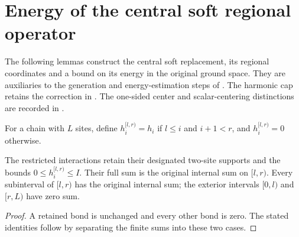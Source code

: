 \section{Energy of the central soft regional operator}

The following lemmas construct the central soft replacement, its regional
coordinates and a bound on its energy in the original ground space.
They are auxiliaries to the generation and energy-estimation steps of
\cite[Figures \texttt{fig:generate} and \texttt{fig:algo1}]{Arad2016RigorousRG}.
The harmonic cap retains the correction in
\cite{gap:alvv16_soft_truncation_log_bound}. The one-sided center and
scalar-centering distinctions are recorded in
\cite{gap:alvv16_soft_regional_energy_centering}.

\begin{definition}
    \label{def:interval_bond_restriction}
    \leanok
    For a chain with $L$ sites, define $h_i^{[l,r)}=h_i$ if
    $l\le i$ and $i+1<r$, and $h_i^{[l,r)}=0$ otherwise.
\end{definition}
\begin{lemma}
    \label{lem:interval_bond_restriction}
    \leanok
    The restricted interactions retain their designated two-site supports
    and the bounds $0\le h_i^{[l,r)}\le I$. Their full sum is the original
    internal sum on $[l,r)$. Every subinterval of $[l,r)$ has the original
    internal sum; the exterior intervals $[0,l)$ and $[r,L)$ have zero sum.
\end{lemma}
\begin{proof}\leanok
    A retained bond is unchanged and every other bond is zero. The stated
    identities follow by separating the finite sums into these two cases.
\end{proof}

